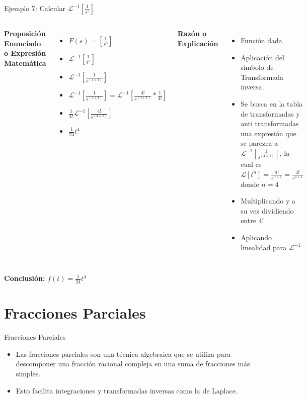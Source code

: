 \documentclass{beamer}
\begin{document}
\begin{frame}{Ejemplo 7: Calcular $\mathcal{L}^{-1}[\frac{1}{s^{5}}]$}
    \begin{columns}
        \textbf{Proposición Enunciado o Expresión Matemática}
        \begin{itemize}
            \item $F(s)=[\frac{1}{s^{5}}]$ 
            \item $\mathcal{L}^{-1}[\frac{1}{s^{5}}]$ 
            \item $\mathcal{L}^{-1}[\frac{1}{s^{(4+1)}}]$ 
            \item $\mathcal{L}^{-1}[\frac{1}{s^{(4+1)}}]=\mathcal{L}^{-1}[\frac{4!}{s^{(4+1)}}*\frac{1}{4!}]$ 
            \item $\frac{1}{4!}\mathcal{L}^{-1}[\frac{4!}{s^{(4+1)}}]$ 
            \item $\frac{1}{24}t^{4}$ 
        \end{itemize}
        \textbf{Razón o Explicación}
        \begin{itemize}
            \item Función dada 
            \item Aplicación del símbolo de Transformada inversa. 
            \item Se busca en la tabla de transformadas y anti transformadas una expresión que se parezca a $\mathcal{L}^{-1}[\frac{1}{s^{(4+1)}}]$, la cual es $\mathcal{L}[t^{n}]=\frac{n!}{s^{n+1}}=\frac{4!}{s^{4+1}}$ donde $n=4$ 
            \item Multiplicando y a su vez dividiendo entre 4! 
            \item Aplicando linealidad para $\mathcal{L}^{-1}$ 
        \end{itemize}
    \end{columns}
    \textbf{Conclusión:} $f(t)=\frac{1}{24}t^{4}$ 
\end{frame}

\section{Fracciones Parciales}
\begin{frame}{Fracciones Parciales}
    \begin{itemize}
        \item Las fracciones parciales son una técnica algebraica que se utiliza para descomponer una fracción racional compleja en una suma de fracciones más simples.
        \item Esto facilita integraciones y transformadas inversas como la de Laplace.
    \end{itemize}
\end{frame}
\end{document}
